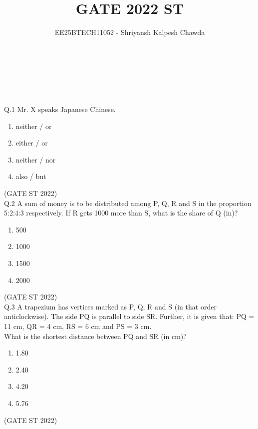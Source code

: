 \documentclass[journal,12pt,onecolumn]{IEEEtran}
\title{\textbf{GATE 2022 ST}}
\author{ EE25BTECH11052 - Shriyansh Kalpesh Chawda}
\theoremstyle{remark}
\begin{document}
	
	\maketitle
	\newpage
	\\
	\\
	\\
	\\
Q.1 Mr. X speaks \underline{\hspace{2cm}} Japanese \underline{\hspace{2cm}} Chinese. 
\begin{multicols}{4}                                     
\begin{enumerate}[label=(\Alph*)]
		\item neither / or
		\item either / or
		\item neither / nor
		\item also / but
\end{enumerate}
\end{multicols}
\hfill (GATE ST 2022)\\
	\vspace{2em}
	Q.2 A sum of money is to be distributed among P, Q, R and S in the proportion 5:2:4:3 respectively.
	If R gets 1000 more than S, what is the share of Q (in)?
	\begin{multicols}{4}
	\begin{enumerate}[label=(\Alph*)]
		\item 500
		\item 1000
		\item 1500
		\item 2000
	
	\end{enumerate}
\end{multicols}
	\hfill (GATE ST 2022)\\
		\vspace{2em}
Q.3 A trapezium has vertices marked as P, Q, R and S (in that order anticlockwise). The side PQ is parallel to side SR. Further, it is given that: PQ = 11 cm, QR = 4 cm, RS = 6 cm and PS = 3 cm. \\
What is the shortest distance between PQ and SR (in cm)?
\begin{multicols}{4}
	\begin{enumerate}[label=(\Alph*)]
		\item 1.80
		\item 2.40
		\item 4.20
		\item 5.76
		\end{enumerate}
\end{multicols}
\hfill (GATE ST 2022)
		\vspace{2em}
		
\end{document}
